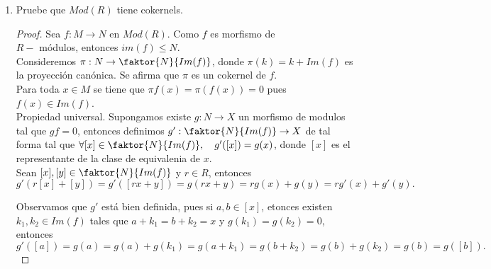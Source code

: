 \documentclass{article}
\begin{document}
\begin{enumerate}[label=\textbf{Ej \arabic*.}]
\begin{proof}
			Sean $r\in R$ $a,b\in K$, entonces $f(ra+b)=rf(a)+f(b)=r\cdot 0+0=0$, por lo tanto $ra+b\in K$, entonces $K\in Mod(R)$ y $\mu$ es morfismo.\\
			
			 Como $f\mu:K\to B$ y para toda $x\in K$ se tiene que $f\mu(x)=f(\mu(x))=f(x)=0$ entonces $f\mu=0$.\\
			
			 Supongamos $g:X\to A$ es un morfismo tal que $fg=0$, entonces $g(x)\in K$ pues $f(g(x))=0$. Así
			definimos el morfismo $h:X\to K$ tal que $h(x)=g(x)$, entonces $\mu h(x)=\mu(g(x))=g(x)$ \,\,$\forall x\in X$, por lo tanto $\mu h=g$ y así $K$ es
			kernel de $f$.\\

			Por lo tanto $Mod(R)$ tiene kernels.\\
		\end{proof}
		\item Pruebe que $Mod(R)$ tiene cokernels.
		
		\begin{proof}
			Sea $f:M\to N$ en $Mod(R)$. Como $f$ es morfismo de \\ $R-$ módulos, entonces $im(f)\leq N$. \\
			
			Consideremos $\pi:N\to \faktor{N}{Im(f)}$, donde $\pi(k)=k+Im(f)$ es la proyección canónica. Se afirma que $\pi$ es un cokernel de $f$.\\
			
			 Para toda $x\in M$ se tiene que $\pi f(x)=\pi(f(x))=0$ pues $f(x)\in Im(f)$.\\
			
			 Propiedad universal. Supongamos existe $g:N\to X$ un morfismo de modulos tal que $gf=0$, entonces definimos 
			$g':\faktor{N}{Im(f)}\to X$ de tal forma tal que $\forall [x]\in \faktor{N}{Im(f)},\quad g'([x])=g(x)$, donde $[x]$ es el representante de
			la clase de equivalenia de $x$.\\
			
			Sean $[x],[y]\in \faktor{N}{Im(f)}$ y $r\in R$, entonces 
			\[g'(r[x]+[y])=g'([rx+y])=g(rx+y)=rg(x)+g(y)=rg'(x)+g'(y).\]
			
			Observamos que $g'$ está bien definida, pues si $a,b\in [x]$, etonces existen $k_1,k_2\in Im(f)$ tales que $a+k_1=b+k_2=x$ y $g(k_1)=g(k_2)=0$,
			entonces 
			\[g'([a])=g(a)=g(a)+g(k_1)=g(a+k_1)=g(b+k_2)=g(b)+g(k_2)=g(b)=g([b]).\]
			

\end{proof}
\end{enumerate}
\end{document}
